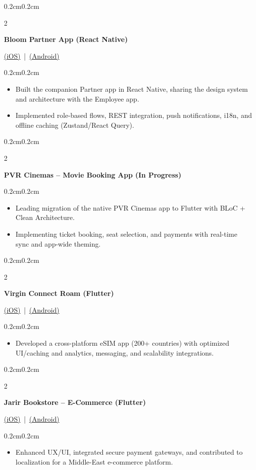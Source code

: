 \documentclass[10pt, letterpaper]{article}
\newenvironment{highlights}{\begin{itemize}[topsep=0.06cm, parsep=0.06cm, partopsep=0pt, itemsep=0pt, leftmargin=0.5cm]}{\end{itemize}}
\newenvironment{onecolentry}{\begin{adjustwidth}{0.2cm}{0.2cm}}{\end{adjustwidth}}
\newenvironment{twocolentry}[2][]{
  \onecolentry
  \def\secondColumn{#2}
  \setcolumnwidth{\fill, 4.5cm}
  \begin{paracol}{2}
}{
  \switchcolumn \raggedleft \secondColumn
  \end{paracol}
  \endonecolentry
}
\begin{document}
\begin{twocolentry}{\href{https://apps.apple.com/in/app/bloom-partners/id6748376789}{(iOS)} \,|\, \href{https://play.google.com/store/apps/details?id=com.bloomholding.connect}{(Android)}}
\textbf{Bloom Partner App (React Native)}
\end{twocolentry}
\begin{onecolentry}
\begin{highlights}
    \item Built the companion Partner app in React Native, sharing the design system and architecture with the Employee app.
    \item Implemented role-based flows, REST integration, push notifications, i18n, and offline caching (Zustand/React Query).
\end{highlights}
\end{onecolentry}

\begin{twocolentry}{}
\textbf{PVR Cinemas – Movie Booking App (In Progress)}
\end{twocolentry}
\begin{onecolentry}
\begin{highlights}
    \item Leading migration of the native PVR Cinemas app to Flutter with BLoC + Clean Architecture.
    \item Implementing ticket booking, seat selection, and payments with real-time sync and app-wide theming.
\end{highlights}
\end{onecolentry}

\begin{twocolentry}{\href{https://apps.apple.com/us/app/virgin-connect-roam/id6475600401}{(iOS)} \,|\, \href{https://play.google.com/store/apps/details?id=one.beyond.esim}{(Android)}}
\textbf{Virgin Connect Roam (Flutter)}
\end{twocolentry}
\begin{onecolentry}
\begin{highlights}
    \item Developed a cross-platform eSIM app (200+ countries) with optimized UI/caching and analytics, messaging, and scalability integrations.
\end{highlights}
\end{onecolentry}

\begin{twocolentry}{\href{https://apps.apple.com/ao/app/jarir-bookstore/id535777677}{(iOS)} \,|\, \href{https://play.google.com/store/apps/details?id=com.jarirbookstore.JBMarketingApp&hl=en_IN}{(Android)}}
\textbf{Jarir Bookstore – E-Commerce (Flutter)}
\end{twocolentry}
\begin{onecolentry}
\begin{highlights}
    \item Enhanced UX/UI, integrated secure payment gateways, and contributed to localization for a Middle-East e-commerce platform.
\end{highlights}
\end{onecolentry}
\end{document}
